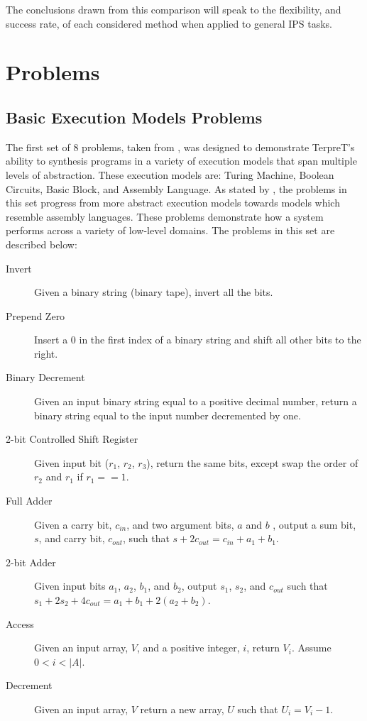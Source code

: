 The conclusions drawn from this comparison will speak to the flexibility, and success rate, of each considered method when applied to general IPS tasks.

\section{Problems}

\subsection{Basic Execution Models Problems}

The first set of 8 problems, taken from \cite{Gaunt2016}, was designed to demonstrate TerpreT's ability to synthesis programs in a variety of execution models that span multiple levels of abstraction. These execution models are: Turing Machine, Boolean Circuits, Basic Block, and Assembly Language. As stated by \cite{Gaunt2016}, the problems in this set progress from more abstract execution models towards models which resemble assembly languages. These problems demonstrate how a system performs across a variety of low-level domains. 
The problems in this set are described below:


\begin{description}

\item[Invert] Given a binary string (binary tape), invert all the bits. 

\item[Prepend Zero] Insert a $0$ in the first index of a binary string and shift all other bits to the right.

\item[Binary Decrement] Given an input binary string equal to a positive decimal number, return a binary string equal to the input number decremented by one.

\item[2-bit Controlled Shift Register] Given input bit ($r_1$, $r_2$, $r_3$), return the same bits, except swap the order of $r_2$ and $r_1$ if $r_1 == 1$.

\item[Full Adder] Given a carry bit, $c_{in}$, and two argument bits, $a$ and $b$ , output a sum bit, $s$, and carry bit, $c_{out}$, such that  $s + 2c_{out} = c_{in} + a_1 + b_1$.

\item[2-bit Adder] Given input bits $a_1$, $a_2$, $b_1$, and $b_2$, output $s_1$, $s_2$, and $c_{out}$ such that  $s_1 + 2s_2 + 4c_{out} = a_1 + b_1 + 2(a_2 + b_2)$.

\item[Access] Given an input array, $V$, and a positive integer, $i$, return $V_i$. Assume $0 < i < |A|$.

\item[Decrement] Given an input array, $V$ return a new array, $U$ such that $U_i = V_i - 1$.

\end{description}

